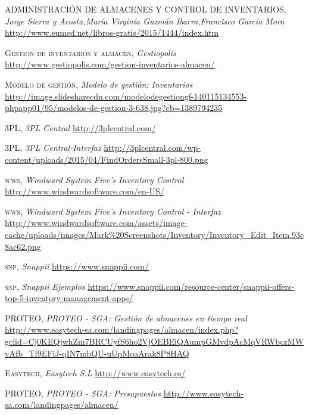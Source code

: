 \documentclass[a4paper,11pt]{book}
\begin{document}
\begin{thebibliography}{aaaa}



 \textsc{ADMINISTRACIÓN DE ALMACENES Y CONTROL DE INVENTARIOS},
\textit{Jorge Sierra y Acosta,María Virginía Guzmán Ibarra,Francisco García Mora}
\url{http://www.eumed.net/libros-gratis/2015/1444/index.htm} 

 \textsc{Gestion de inventarios y almacén},
\textit{Gestiopolis}
\url{http://www.gestiopolis.com/gestion-inventarios-almacen/} 


 \textsc{Modelo de gestión},
\textit{Modelo de gestión: Inventarios}
\url{http://image.slidesharecdn.com/modelodegestiongf-140115134553-phpapp01/95/modelos-de-gestion-3-638.jpg?cb=1389794235}

 \textsc{3PL},
\textit{3PL Central}
\url{http://3plcentral.com/} 

 \textsc{3PL},
\textit{3PL Central-Interfaz }
\url{http://3plcentral.com/wp-content/uploads/2015/04/FindOrdersSmall-3pl-800.png} 


 \textsc{wws},
\textit{Windward System Five's Inventory Control}
\url{http://www.windwardsoftware.com/en-US/}

 \textsc{wws},
\textit{Windward System Five's Inventory Control - Interfaz}
\url{http://www.windwardsoftware.com/assets/image-cache/uploads/images/Mark\%20Screenshots/Inventory/Inventory_Edit_Item.93e8ac62.png}



 \textsc{snp},
\textit{Snappii}
\url{https://www.snappii.com/}

 \textsc{snp},
\textit{Snappii Ejemplos}
\url{https://www.snappii.com/resource-center/snappii-offers-top-5-inventory-management-apps/}


 \textsc{PROTEO},
\textit{PROTEO - SGA: Gestión de almacenes en tiempo real}
\url{http://www.easytech-sa.com/landingpages/almacen/index.php?gclid=Cj0KEQjwhZm7BRCUyfS6ho2VjOEBEiQAumpGMvdpAcMqVRWbczMWvAfb_Tf9EFiJ-qIN7mbQU-uUpMoaArak8P8HAQ}

 \textsc{Easytech},
\textit{Easytech S.L}
\url{http://www.easytech.es/}

 \textsc{PROTEO},
\textit{PROTEO - SGA: Presupuestos}
\url{http://www.easytech-sa.com/landingpages/almacen/}





\end{thebibliography}
\end{document}
